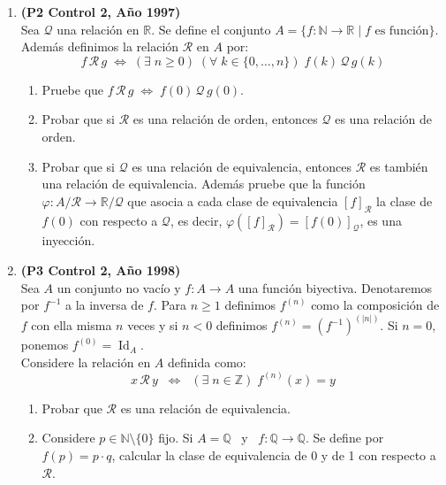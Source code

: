 \documentclass[10pt]{article}
\newcommand{\Q}{\mathbb Q}
\newcommand{\R}{\mathbb R}
\newcommand{\N}{\mathbb N}
\newcommand{\Z}{\mathbb Z}
\newcommand{\id}{\operatorname{Id}} %
\theoremstyle{plain}
\newcommand{\cur}[1]{\mathcal{#1}}
\theoremstyle{definition}
\begin{document}
\begin{enumerate}[label=\textbf{P\arabic*.-}]

\item \textbf{(P2 Control 2, Año 1997)}\\
Sea $\cur{Q}$ una relación en $\R$. Se define el conjunto $A=\{f:\N\longrightarrow \R \;|\; f \mbox{ es función}\}$. \\ Además definimos la relación $\cur{R}$ en $A$ por:\\ 
$$f\,\cur{R}\,g\; \Longleftrightarrow \; (\exists \; n\geq 0)\;(\forall \; k\in\{0,\ldots,n\})\; f(k)\,\cur{Q}\,g(k)$$
\begin{enumerate}
\item Pruebe que $f\,\cur{R}\,g \; \Longleftrightarrow \; f(0)\,\cur{Q}\,g(0)$.
\item Probar que si $\cur{R}$ es una relación de orden, entonces $\cur{Q}$ es una relación de orden.
\item Probar que si $\cur{Q}$ es una relación de equivalencia, entonces $\cur{R}$ es también una relación de equivalencia. Además pruebe que la función $\varphi: A/\cur{R} \longrightarrow \R/\cur{Q}$ que asocia a cada clase de equivalencia $[f]_{\cur{R}}$ la clase de $f(0)$ con respecto a $\cur{Q}$, es decir, $\varphi([f]_{\cur{R}})=[f(0)]_{\cur{Q}}$, es una inyección.
\end{enumerate}

\item \textbf{(P3 Control 2, Año 1998)}\\
Sea $A$ un conjunto no vacío y $f:A\longrightarrow A$ una función biyectiva. Denotaremos por $f^{-1}$ a la inversa de $f$. Para $n\geq 1$ definimos $f^{(n)}$ como la composición de $f$ con ella misma $n$ veces y si $n<0$ definimos $f^{(n)}=(f^{-1})^{(|n|)}$. Si $n=0$, ponemos $f^{(0)}=\id_{A}$.\\
Considere la relación en $A$ definida como:
$$x\,\cur{R}\,y \;\; \Longleftrightarrow \;\; (\exists\;n\in\Z)\; f^{(n)}(x)=y$$
\begin{enumerate}
\item Probar que $\cur{R}$ es una relación de equivalencia.
\item Considere $p\in\N\setminus \{0\}$ fijo. Si $A=\Q$ \  y \ $f:\Q\longrightarrow \Q$. Se define por $f(p)=p\cdot q$, calcular la clase de equivalencia de 0 y de 1 con respecto a $\cur{R}$.
\end{enumerate}


\end{enumerate}
\end{document}

